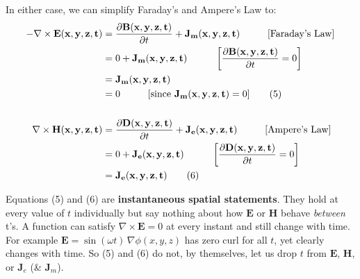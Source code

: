 In either case, we can simplify Faraday's and Ampere's Law to:
\begin{align*}
    -\nabla \times \mathbf{E(x,y,z,t)} &= \frac{\partial \mathbf{B(x,y,z,t)}}{\partial t} + \mathbf{J_m(x,y,z,t)} \hspace{1cm} \text{[Faraday's Law]} \\
                                       &= 0 + \mathbf{J_m(x,y,z,t)} \hspace{1cm} \left[\frac{\partial \mathbf{B(x,y,z,t)}}{\partial t} = 0\right] \\
                                       &= \mathbf{J_m(x,y,z,t)} \\
     &= 0  \hspace{1cm} \text{[since \( \mathbf{J_m(x,y,z,t)} = 0 \)]} \tag{5} \\\\
    \nabla \times \mathbf{H(x,y,z,t)} &= \frac{\partial \mathbf{D(x,y,z,t)}}{\partial t} + \mathbf{J_e(x,y,z,t)} \hspace{1cm} \text{[Ampere's Law]} \\
                                      &= 0 + \mathbf{J_e(x,y,z,t)} \hspace{1cm} \left[\frac{\partial \mathbf{D(x,y,z,t)}}{\partial t} = 0\right] \\
                                      &= \mathbf{J_e(x,y,z,t)} \tag{6}
\end{align*}

Equations (5) and (6) are \textbf{instantaneous spatial statements}. They hold at every
value of \(t\) individually but say nothing about how \(\mathbf{E}\) or \(\mathbf{H}\)
behave \emph{between} t's. A function can satisfy \(\nabla\times\mathbf{E}=0\) at
every instant and still change with time. For example \(\mathbf{E} = \sin(\omega t)\,
\nabla\phi(x,y,z)\) has zero curl for all \(t\), yet clearly changes with time. So (5)
and (6) do not, by themselves, let us drop \(t\) from \(\mathbf{E}\), \(\mathbf{H}\),
or \(\mathbf{J}_e\) (\& \(\mathbf{J}_m\)).

